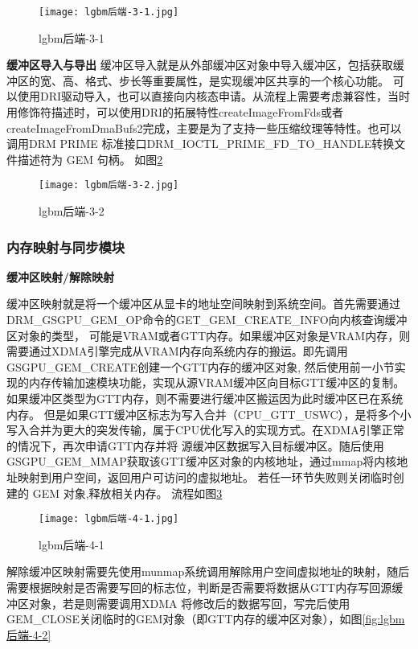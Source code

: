 \begin{figure}[h]
  \centering
  \texttt{[image: lgbm后端-3-1.jpg]}
  \caption{lgbm后端-3-1}
  \label{fig:lgbm后端-3-1}
\end{figure}  

\textbf{缓冲区导入与导出}
缓冲区导入就是从外部缓冲区对象中导入缓冲区，包括获取缓冲区的宽、高、格式、步长等重要属性，是实现缓冲区共享的一个核心功能。
可以使用DRI驱动导入，也可以直接向内核态申请。从流程上需要考虑兼容性，当时用修饰符描述时，可以使用DRI的拓展特性createImageFromFds或者
createImageFromDmaBufs2完成，主要是为了支持一些压缩纹理等特性。也可以调用​DRM PRIME 标准接口​DRM\_IOCTL\_PRIME\_FD\_TO\_HANDLE转换文件描述符为 GEM 句柄。
如图\ref{fig:lgbm后端-3-2}

\begin{figure}[h]
  \centering
  \texttt{[image: lgbm后端-3-2.jpg]}
  \caption{lgbm后端-3-2}
  \label{fig:lgbm后端-3-2}
\end{figure}  

\subsubsection{内存映射与同步模块}

\textbf{缓冲区映射/解除映射}

缓冲区映射就是将一个缓冲区从显卡的地址空间映射到系统空间。首先需要通过DRM\_GSGPU\_GEM\_OP命令的GET\_GEM\_CREATE\_INFO向内核查询缓冲区对象的类型，
可能是VRAM或者GTT内存。如果缓冲区对象是VRAM内存，则需要通过XDMA引擎完成从VRAM内存向系统内存的搬运。即先调用GSGPU\_GEM\_CREATE创建一个GTT内存的缓冲区对象,
然后使用前一小节实现的内存传输加速模块功能，实现从源VRAM缓冲区向目标GTT缓冲区的复制。如果缓冲区类型为GTT内存，则不需要进行缓冲区搬运因为此时缓冲区已在系统内存。
但是如果GTT缓冲区标志为写入合并（CPU\_GTT\_USWC），是将多个小写入合并为更大的突发传输，属于CPU优化写入的实现方式。在XDMA引擎正常的情况下，再次申请GTT内存并将
源缓冲区数据写入目标缓冲区。随后使用GSGPU\_GEM\_MMAP获取该GTT缓冲区对象的内核地址，通过mmap将内核地址映射到用户空间，返回用户可访问的虚拟地址。
若任一环节失败则关闭临时创建的 GEM 对象,释放相关内存。
流程如图\ref{fig:lgbm后端-4-1}

\begin{figure}[h]
  \centering
  \texttt{[image: lgbm后端-4-1.jpg]}
  \caption{lgbm后端-4-1}
  \label{fig:lgbm后端-4-1}
\end{figure} 

解除缓冲区映射需要先使用munmap系统调用解除用户空间虚拟地址的映射，随后需要根据映射是否需要写回的标志位，判断是否需要将数据从GTT内存写回源缓冲区对象，若是则需要调用XDMA
将修改后的数据写回，写完后使用GEM\_CLOSE关闭临时的GEM对象（即GTT内存的缓冲区对象），如图\ref{fig:lgbm后端-4-2}

